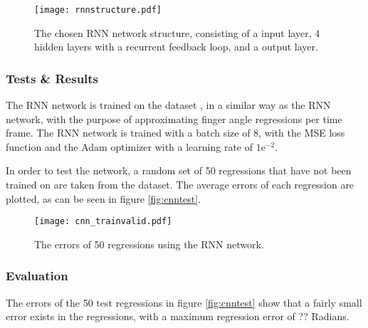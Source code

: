 \documentclass[../main.tex]{subfiles}
\begin{document}
\begin{figure}[H]
\begin{center}
\texttt{[image: rnnstructure.pdf]}
\caption{The chosen RNN network structure, consisting of a input layer, 4 hidden layers with a recurrent feedback loop, and a output layer.}
\label{fig:rnn_structure}
\end{center}
\end{figure}

\subsubsection{Tests \& Results}

The RNN network is trained on the dataset \cite{kinmusdataset}, in a similar way as the RNN network, with the purpose of approximating finger angle regressions per time frame.
The RNN network is trained with a batch size of 8, with the  MSE loss function and the Adam optimizer with a learning rate of $1\text{e}^{-2}$.

In order to test the network, a random set of 50 regressions that have not been trained on are taken from the dataset.
The average errors of each regression are plotted, as can be seen in figure \ref{fig:cnntest}.

\begin{figure}[H]
\begin{center}
\texttt{[image: cnn\_trainvalid.pdf]}
\caption{The errors of 50 regressions using the RNN network.}
\label{fig:rnntest}
\end{center}
\end{figure}


\subsubsection{Evaluation}

The errors of the 50 test regressions in figure \ref{fig:cnntest} show that a fairly small error exists in the regressions, with a maximum regression error of ?? Radians.


\end{document}

